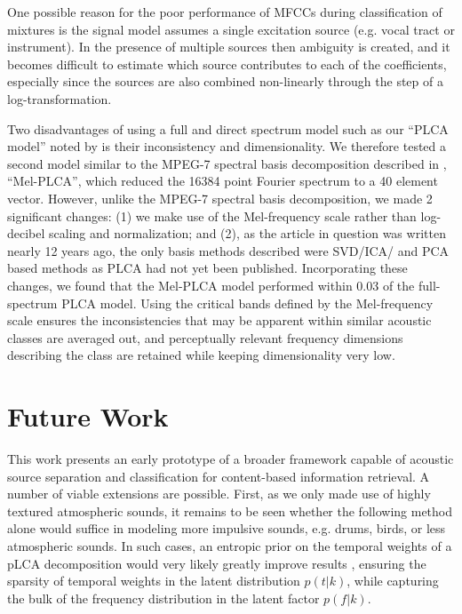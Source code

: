\documentclass[a4paper,10pt,final]{ThesisStyle}
\begin{document}
One possible reason for the poor performance of MFCCs during classification of mixtures is the signal model assumes a single excitation source (e.g. vocal tract or instrument).  In the presence of multiple sources then ambiguity is created, and it becomes difficult to estimate which source contributes to each of the coefficients, especially since the sources are also combined non-linearly through the step of a log-transformation. 

Two disadvantages of using a full and direct spectrum model such as our ``PLCA model'' noted by \cite{Casey2001a} is their inconsistency and dimensionality.  We therefore tested a second model similar to the MPEG-7 spectral basis decomposition described in  \cite{Casey2001a}, ``Mel-PLCA'', which reduced the 16384 point Fourier spectrum to a 40 element vector.  However, unlike the MPEG-7 spectral basis decomposition, we made 2 significant changes: (1) we make use of the Mel-frequency scale rather than log-decibel scaling and normalization; and (2), as the article in question was written nearly 12 years ago, the only basis methods described were SVD/ICA/ and PCA based methods as PLCA had not yet been published.  Incorporating these changes, we found that the Mel-PLCA model performed within 0.03 of the full-spectrum PLCA model.  Using the critical bands defined by the Mel-frequency scale ensures the inconsistencies that may be apparent within similar acoustic classes are averaged out, and perceptually relevant frequency dimensions describing the class are retained while keeping dimensionality very low.  

\section{Future Work}

This work presents an early prototype of a broader framework capable of acoustic source separation and classification for content-based information retrieval.  A number of viable extensions are possible.  First, as we only made use of highly textured atmospheric sounds, it remains to be seen whether the following method alone would suffice in modeling more impulsive sounds, e.g. drums, birds, or less atmospheric sounds.  In such cases, an entropic prior on the temporal weights of a pLCA decomposition would very likely greatly improve results \cite{Smaragdis2007}, ensuring the sparsity of temporal weights in the latent distribution $p(t|k)$, while capturing the bulk of the frequency distribution in the latent factor $p(f|k)$. 
\end{document}
